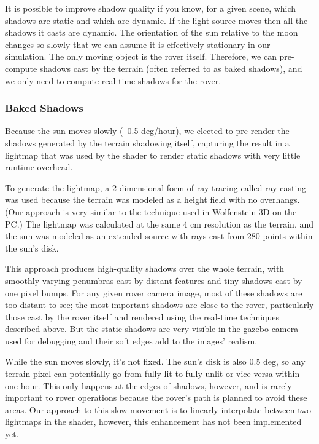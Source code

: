 \documentclass[twocolumn,letterpaper]{IEEEAerospaceCLS}  %
\begin{document}
It is possible to improve shadow quality if you know, for a given scene, which shadows are static and which are dynamic. If the light source moves then all the shadows it casts are dynamic. The orientation of the sun relative to the moon changes so slowly that we can assume it is effectively stationary in our simulation. The only moving object is the rover itself. Therefore, we can pre-compute shadows cast by the terrain (often referred to as baked shadows), and we only need to compute real-time shadows for the rover.

\subsubsection{Baked Shadows}

Because the sun moves slowly (~0.5 deg/hour), we elected to pre-render the shadows generated by the terrain shadowing itself, capturing the result in a lightmap that was used by the shader to render static shadows with very little runtime overhead.

To generate the lightmap, a 2-dimensional form of ray-tracing called ray-casting was used because the terrain was modeled as a height field with no overhangs.  (Our approach is very similar to the technique used in Wolfenstein 3D on the PC.)  The lightmap was calculated at the same 4 cm resolution as the terrain, and the sun was modeled as an extended source with rays cast from 280 points within the sun's disk.

This approach produces high-quality shadows over the whole terrain, with smoothly varying penumbras cast by distant features and tiny shadows cast by one pixel bumps.  For any given rover camera image, most of these shadows are too distant to see; the most important shadows are close to the rover, particularly those cast by the rover itself and rendered using the real-time techniques described above.  But the static shadows are very visible in the gazebo camera used for debugging and their soft edges add to the images' realism.

While the sun moves slowly, it's not fixed.  The sun's disk is also 0.5 deg, so any terrain pixel can potentially go from fully lit to fully unlit or vice versa within one hour.  This only happens at the edges of shadows, however, and is rarely important to rover operations because the rover's path is planned to avoid these areas.  Our approach to this slow movement is to linearly interpolate between two lightmaps in the shader, however, this enhancement has not been implemented yet.
\end{document}
